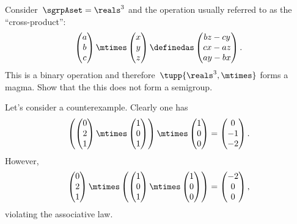 \begin{exercise}
	\label{ex:cross_prod}
	Consider~$\sgrpAset=\reals^3$ and the operation usually referred to as the ``cross-product'':
	\begin{equation*}
		\begin{pmatrix}
			a \\ b\\ c
		\end{pmatrix}
		\mtimes
		\begin{pmatrix}
			x \\ y \\ z
		\end{pmatrix}
		\definedas
		\begin{pmatrix}
			bz-cy \\
			cx-az \\
			ay-bx
		\end{pmatrix}.
	\end{equation*}
	This is a binary operation and therefore~$\tupp{\reals^3,\mtimes}$ forms a magma.
	Show that the this does not form a semigroup.
\end{exercise}
%
\begin{solution}
	Let's consider a counterexample.
	Clearly one has
	\begin{equation}
		\left(
		\begin{pmatrix}
			0 \\ 2\\ 1
		\end{pmatrix}\mtimes
		\begin{pmatrix}
			1 \\ 0 \\ 1
		\end{pmatrix}
		\right)
		\mtimes
		\begin{pmatrix}
			1 \\ 0 \\ 0
		\end{pmatrix}
		=
		\begin{pmatrix}
			0 \\-1\\-2
		\end{pmatrix}.
	\end{equation}
	However,
	\begin{equation}
		\begin{pmatrix}
			0 \\ 2\\ 1
		\end{pmatrix}\mtimes \left(\begin{pmatrix}
			1 \\ 0 \\ 1
		\end{pmatrix}\mtimes
		\begin{pmatrix}
			1 \\ 0 \\ 0
		\end{pmatrix}\right)
		=\begin{pmatrix}
			-2 \\0\\0
		\end{pmatrix},
	\end{equation}
	violating the associative law.
\end{solution}

